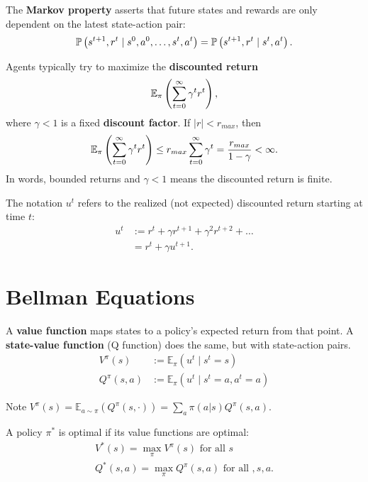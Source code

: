 \documentclass[twoside,10pt]{report}
\begin{document}
\begin{defn}
The \textbf{Markov property} asserts that future states and rewards are only dependent on the latest state-action pair:
\[
\P{ s^{t+1}, r^{t} \;|\; s^{0},a^{0},\dots, s^{t},a^{t} } = \P{ s^{t+1},r^{t}\;|\; s^{t},a^{t} }.
\] 
\end{defn}

Agents typically try to maximize the \textbf{discounted return}
\[
	\EE{ \pi }{ \sum_{t=0}^{\infty} \gamma^{t}r^{t} },
\] where $\gamma < 1$ is a fixed \textbf{discount factor}. If $|r| < r_{max}$, then
\[
	\EE{ \pi }{ \sum_{t=0}^{\infty} \gamma^{t}r^{t} } \leq r_{max} \sum_{t=0}^{\infty} \gamma^{t} = \frac{r_{max}}{1-\gamma} < \infty.
\] In words, bounded returns and $\gamma < 1$ means the discounted return is finite.

The notation $u^{t}$ refers to the realized (not expected) discounted return starting at time $t$:
\begin{align*}
	u^{t} &:= r^{t} + \gamma r^{t+1} + \gamma^{2} r^{t+2} + \dots \\
	      &= r^{t} + \gamma u^{t+1}.
\end{align*}

\section{Bellman Equations}

\begin{defn}
A \textbf{value function} maps states to a policy's expected return from that point. A \textbf{state-value function} (Q function) does the same, but with state-action pairs.
\begin{align*}
	V^{\pi}(s) &:= \mathbb{E}_{\pi}\left( u^{t} \;|\; s^{t} = s \right) \\
	Q^{\pi}(s, a) &:= \mathbb{E}_{\pi}\left( u^{t} \;|\; s^{t}=a, a^{t}=a \right)
\end{align*}

Note $V^{\pi}(s) = \mathbb{E}_{a \sim \pi}\left( Q^{\pi}(s,\cdot) \right) = \sum_{a} \pi(a|s) Q^{\pi}(s,a)$.

\end{defn}

A policy $\pi^{*}$ is optimal if its value functions are optimal:
\begin{align*}
	V^{*}(s) = \max_{\pi} V^{\pi}(s) \text{ for all } s \\
	Q^{*}(s,a) = \max_{\pi} Q^{\pi}(s,a) \text{ for all }, s,a.
\end{align*}
\end{document}
